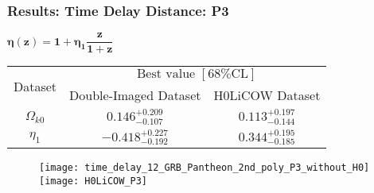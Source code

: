 \documentclass[10pt,xcolor={dvipsnames}]{beamer}
\begin{document}
\begin{frame}
 \frametitle{Results: Time Delay Distance: P3}
 $
{\boxed{\boldsymbol{\eta(z)=1+\eta_1\dfrac{z}{1+z}}}}
$

\begin{table}
  \begin{tabular}{|c|c|c|}
    \hline
    \multirow{2}{*}{Dataset} &
      \multicolumn{2}{c|}{${\text { Best value }[68 \% \mathrm{CL}]}$} \\
\cline{2-3}
    &Double-Imaged Dataset & H0LiCOW Dataset \\
    \hline
    $\Omega_{k0}$ & $ {0.146_{-0.107}^{+0.209}}$ & $0.113^{+0.197}_{-0.144}$ \\
    \hline
    $ \eta_1$ &${-0.418_{-0.192}^{+0.227}}$ &  $0.344^{+0.195}_{-0.185}$  \\
       \hline
  \end{tabular}
\end{table}


 \begin{figure}[ht!]
\centering
\texttt{[image: time\_delay\_12\_GRB\_Pantheon\_2nd\_poly\_P3\_without\_H0]}
\texttt{[image: H0LiCOW\_P3]}
\end{figure} 
\end{frame}
\end{document}
